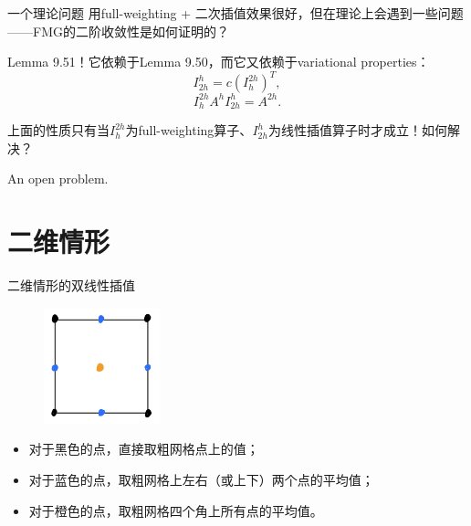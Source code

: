\documentclass[9pt]{beamer}
\begin{document}
\begin{frame}{一个理论问题}
用full-weighting + 二次插值效果很好，但在理论上会遇到一些问题——FMG的二阶收敛性是如何证明的？
\vspace{1em}

\pause
Lemma 9.51！它依赖于Lemma 9.50，而它又依赖于variational properties：
\begin{equation}
I_{2h}^h=c(I_h^{2h})^T,
\end{equation}
\begin{equation}
I_h^{2h}A^hI_{2h}^h=A^{2h}.
\end{equation}

上面的性质只有当$I_h^{2h}$为full-weighting算子、$I_{2h}^h$为线性插值算子时才成立！如何解决？
\vspace{1em}

\pause
An open problem.
\end{frame}

\section{二维情形}

\begin{frame}{二维情形的双线性插值}
  \small
 \begin{figure}[H]
  \centering
  \includegraphics[width=0.3\textwidth]{pic/bilinear.jpg}
\end{figure}

\begin{itemize}
	\item 对于黑色的点，直接取粗网格点上的值；
	\item 对于蓝色的点，取粗网格上左右（或上下）两个点的平均值；
	\item 对于橙色的点，取粗网格四个角上所有点的平均值。
\end{itemize}
\end{frame}
\end{document}

